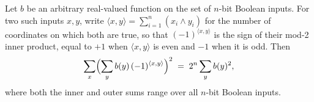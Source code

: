 \begin{lemma}
\label{CommunicationComplexity.Functions.InnerProduct.sum_sq_mul_boolSign_innerProduct}
\leanok
{}
Let $b$ be an arbitrary real-valued function on the set of $n$-bit Boolean inputs. For
two such inputs $x,y$, write $\langle x,y\rangle = \sum_{i=1}^{n}(x_i \wedge y_i)$ for
the number of coordinates on which both are true, so that $(-1)^{\langle x,y\rangle}$ is
the sign of their mod-2 inner product, equal to $+1$ when $\langle x,y\rangle$ is even
and $-1$ when it is odd. Then
\[
  \sum_{x}\Bigl(\sum_{y} b(y)\,(-1)^{\langle x,y\rangle}\Bigr)^2
  \;=\; 2^n \sum_{y} b(y)^2,
\]
where both the inner and outer sums range over all $n$-bit Boolean inputs.
\end{lemma}

